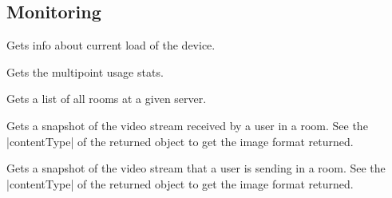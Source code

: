 \subsection{Monitoring}
\begin{Api}

Gets info about current load of the device.

Gets the multipoint usage stats.

Gets a list of all rooms at a given server.

Gets a snapshot of the video stream received by a user in a room. See the |contentType| of the returned object to get the image format returned.

Gets a snapshot of the video stream that a user is sending in a room. See the |contentType| of the returned object to get the image format returned.

\end{Api}


